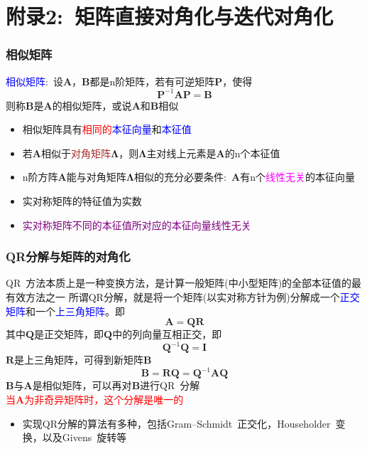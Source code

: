 \documentclass[cjk,slidestop,compress,mathserif,blue]{beamer}
\begin{document}
\section{附录2:~矩阵直接对角化与迭代对角化}
\frame
{
	\frametitle{相似矩阵}
\textcolor{blue}{相似矩阵}:~设$\mathbf{A}$，$\mathbf{B}$都是\textrm{n}阶矩阵，若有可逆矩阵$\mathbf{P}$，使得
	\begin{displaymath}
		\mathbf{P}^{-1}\mathbf{A}\mathbf{P}=\mathbf{B}
	\end{displaymath}
	则称$\mathbf{B}$是$\mathbf{A}$的相似矩阵，或说$\mathbf{A}$和$\mathbf{B}$相似
	\begin{itemize}
		\item 相似矩阵具有\textcolor{red}{相同的}\textcolor{blue}{本征向量}和\textcolor{blue}{本征值}
		\item 若$\mathbf{A}$相似于\textcolor{brown}{对角矩阵}$\boldsymbol{\Lambda}$，则$\boldsymbol{\Lambda}$主对线上元素是$\mathbf{A}$的\textrm{n}个本征值
		\item \textrm{n}阶方阵$\mathbf{A}$能与对角矩阵$\boldsymbol{\Lambda}$相似的充分必要条件:~$\mathbf{A}$有\textrm{n}个\textcolor{magenta}{线性无关}的本征向量
		\item 实对称矩阵的特征值为实数
		\item \textcolor{purple}{实对称矩阵不同的本征值所对应的本征向量线性无关}
	\end{itemize}
}

\frame
{
	\frametitle{\textrm{QR}分解与矩阵的对角化}
	\textrm{QR~}方法本质上是一种变换方法，是计算一般矩阵(中小型矩阵)的全部本征值的最有效方法之一
\vskip 5pt
	所谓\textrm{QR}分解，就是将一个矩阵(以实对称方针为例)分解成一个\textcolor{blue}{正交矩阵}和一个\textcolor{blue}{上三角矩阵}。即
	\begin{displaymath}
		\mathbf{A}=\mathbf{Q}\mathbf{R}
	\end{displaymath}
	其中$\mathbf{Q}$是正交矩阵，即$\mathbf{Q}$中的列向量互相正交，即
	\begin{displaymath}
		\mathbf{Q}^{-1}\mathbf{Q}=\mathbf{I} 
	\end{displaymath}
	$\mathbf{R}$是上三角矩阵，可得到新矩阵$\mathbf{B}$
	\begin{displaymath}
		\mathbf{B}=\mathbf{R}\mathbf{Q}=\mathbf{Q}^{-1}\mathbf{A}\mathbf{Q}
	\end{displaymath}
	$\mathbf{B}$与$\mathbf{A}$是相似矩阵，可以再对$\mathbf{B}$进行\textrm{QR~}分解\\
	\textcolor{red}{当$\mathbf{A}$为非奇异矩阵时，这个分解是唯一的}
	\begin{itemize}
		\item 实现\textrm{QR}分解的算法有多种，包括\textrm{Gram–Schmidt~}正交化，\textrm{Householder~}变换，以及\textrm{Givens~}旋转等
	\end{itemize}
}
\end{document}
